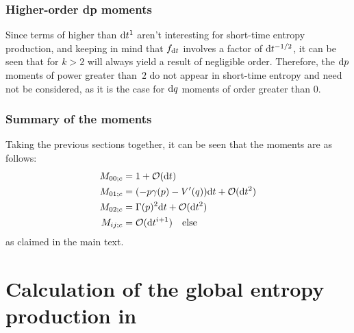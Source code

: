 \subsubsection{Higher-order dp moments}

Since terms of higher than \(\mathrm{d} t^1\) aren't interesting for short-time entropy production, and keeping in mind that \(f_{\mathrm{d} t}\) involves a factor of \(\mathrm{d} t^{-1/2}\), it can be seen that for \(k>2\)  will always yield a result of negligible order. Therefore, the \(\mathrm{d} p\) moments of power greater than~\(2\) do not appear in short-time entropy and need not be considered, as it is the case for \(\mathrm{d} q\) moments of order greater than \(0\).

\subsubsection{Summary of the moments}

Taking the previous sections together, it can be seen that the moments are as follows:
%
\begin{align*}
	M_{00;c} &= 1 + \mathcal{O}(\mathrm{d} t) \\
	M_{01;c} &= (-p\gamma(p) - V'(q)) \mathrm{d} t + \mathcal{O}(\mathrm{d} t^2) \\
	M_{02;c} &= \Gamma(p)^2 \mathrm{d} t + \mathcal{O}(\mathrm{d} t^2) \\
	M_{ij;c} &= \mathcal{O}(\mathrm{d} t^{i+1}) \quad\text{else}
\end{align*}
%
as claimed in the main text.


\section{Calculation of the global entropy production in }
\label{sec:global entropy zero}

